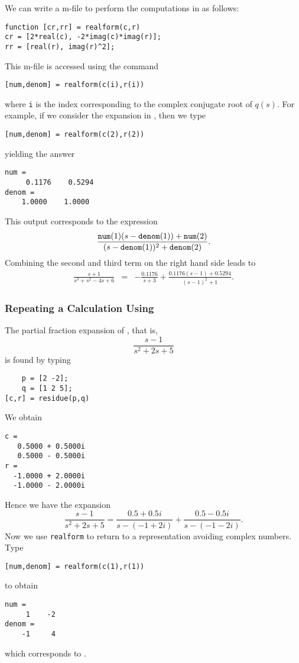 \documentclass{ximera}
\begin{document}
We can write a \Matlab m-file to perform the computations in 
as follows:
\begin{verbatim}
function [cr,rr] = realform(c,r)
cr = [2*real(c), -2*imag(c)*imag(r)];
rr = [real(r), imag(r)^2];
\end{verbatim}
This m-file is accessed using the command 
\begin{verbatim}
[num,denom] = realform(c(i),r(i))
\end{verbatim}
where {\tt i} is the index corresponding to the complex conjugate root of 
$q(s)$.  For example, if we consider the expansion in , then we 
type 
\begin{verbatim}
[num,denom] = realform(c(2),r(2))
\end{verbatim}
yielding the answer
\begin{verbatim}
num =
     0.1176    0.5294
denom = 
    1.0000    1.0000
\end{verbatim}
This output corresponds to the expression
\[
\frac{{\tt num}(1)(s-{\tt denom}(1)) + {\tt num}(2)}{(s-{\tt denom}(1))^2 + 
{\tt denom}(2)}.
\]
Combining the second and third term on the right hand side leads to
\begin{eqnarray*}
\frac{s+1}{s^3+s^2-4s+6} & = & 
-\frac{0.1176}{s+3} + \frac{0.1176(s-1)+0.5294}{(s-1)^2+1}.
\end{eqnarray*}

\subsubsection*{Repeating a Calculation Using \Matlab}

The partial fraction expansion of , that is,
\[
\frac{s-1}{s^2+2s+5}
\]
is found by typing
\begin{verbatim}
    p = [2 -2];
    q = [1 2 5];
[c,r] = residue(p,q)
\end{verbatim}
We obtain
\begin{verbatim}
c =
   0.5000 + 0.5000i
   0.5000 - 0.5000i
r =
  -1.0000 + 2.0000i
  -1.0000 - 2.0000i
\end{verbatim}
Hence we have the expansion
\[
\frac{s-1}{s^2+2s+5}= \frac{0.5+0.5i}{s-(-1+2i)}+\frac{0.5-0.5i}{s-(-1-2i)}.
\]
Now we use {\tt realform} 
to return to a representation avoiding complex numbers.  Type
\begin{verbatim}
[num,denom] = realform(c(1),r(1))
\end{verbatim}
to obtain
\begin{verbatim}
num = 
     1    -2
denom = 
    -1     4
\end{verbatim}
which corresponds to .
\end{document}
